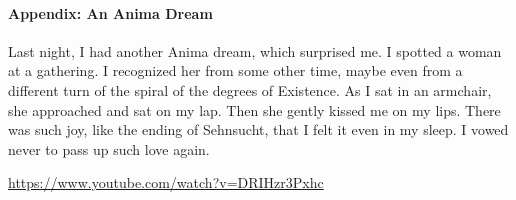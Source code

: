 \paragraph{Appendix: An Anima Dream}
Last night, I had another Anima dream, which surprised me. I spotted a woman at a gathering. I recognized her from some other time, maybe even from a different turn of the spiral of the degrees of Existence. As I sat in an armchair, she approached and sat on my lap. Then she gently kissed me on my lips. There was such joy, like the ending of Sehnsucht, that I felt it even in my sleep. I vowed never to pass up such love again.

\url{https://www.youtube.com/watch?v=DRIHzr3Pxhc}



